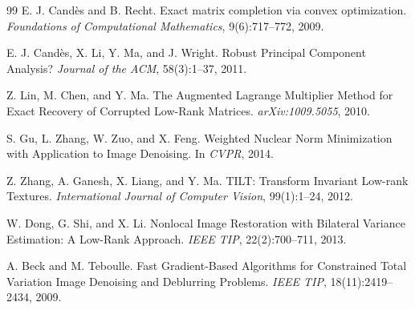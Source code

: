 \documentclass[10.5pt, a4paper]{article}
\begin{document}
\begin{thebibliography}{99}
E. J. Cand\`es and B. Recht.
\newblock Exact matrix completion via convex optimization.
\newblock \emph{Foundations of Computational Mathematics}, 9(6):717--772, 2009.

E. J. Cand\`es, X. Li, Y. Ma, and J. Wright.
\newblock Robust Principal Component Analysis?
\newblock \emph{Journal of the ACM}, 58(3):1--37, 2011.

Z. Lin, M. Chen, and Y. Ma.
\newblock The Augmented Lagrange Multiplier Method for Exact Recovery of Corrupted Low-Rank Matrices.
\newblock \emph{arXiv:1009.5055}, 2010.

S. Gu, L. Zhang, W. Zuo, and X. Feng.
\newblock Weighted Nuclear Norm Minimization with Application to Image Denoising.
\newblock In \emph{CVPR}, 2014.

Z. Zhang, A. Ganesh, X. Liang, and Y. Ma.
\newblock TILT: Transform Invariant Low-rank Textures.
\newblock \emph{International Journal of Computer Vision}, 99(1):1--24, 2012.

W. Dong, G. Shi, and X. Li.
\newblock Nonlocal Image Restoration with Bilateral Variance Estimation: A Low-Rank Approach.
\newblock \emph{IEEE TIP}, 22(2):700--711, 2013.

A. Beck and M. Teboulle.
\newblock Fast Gradient-Based Algorithms for Constrained Total Variation Image Denoising and Deblurring Problems.
\newblock \emph{IEEE TIP}, 18(11):2419--2434, 2009.
\end{thebibliography}
\end{document}
